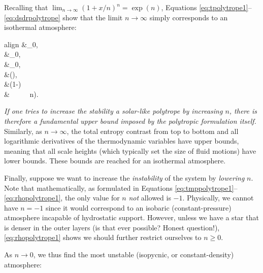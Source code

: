 \documentclass[12pt]{article} %
\begin{document}
Recalling that $\lim_{n\rightarrow\infty}(1+x/n)^n=\exp(n)$, Equations \eqref{eq:tpolytrope1}--\eqref{eq:dsdrpolytrope} show that the limit $n\rightarrow\infty$ simply corresponds to an isothermal atmosphere:
	\begin{empheq}[box=\fbox]{align}\label{eq:limitninfty}
\tmpref\ofr&\rightarrow \tmpref_0, \\
\prsref\ofr&\rightarrow \prsref_0,\\
\rhoref\ofr&\rightarrow \rhoref_0,\\
\dsdr &\rightarrow {}\left(\right),\\
 \andd \frac{\sref\ofr}{\cp} &\rightarrow {}\left(1-\right)\\ 
 &\ \ \ \ \  n\rightarrow\infty). \nonumber
\end{empheq}
\textit{If one tries to increase the stability a solar-like polytrope by increasing $n$, there is therefore a fundamental upper bound imposed by the polytropic formulation itself.}
Similarly, as $n\rightarrow\infty$, the total entropy contrast from top to bottom and all logarithmic derivatives of the thermodynamic variables have upper bounds, meaning that all scale heights (which typically set the size of fluid motions) have lower bounds. These bounds are reached for an isothermal atmosphere.

Finally, suppose we want to increase the \textit{instability} of the system by \textit{lowering} $n$. Note that mathematically, as formulated in Equations \eqref{eq:tmppolytrope1}--\eqref{eq:rhopolytrope1}, the only value for $n$ \textit{not} allowed is $-1$. Physically, we cannot have $n=-1$ since it would correspond to an isobaric (constant-pressure) atmosphere incapable of hydrostatic support. However, unless we have a star that is denser in the outer layers (is that ever possible? Honest question!), \eqref{eq:rhopolytrope1} shows we should further restrict ourselves to $n\geq0$. 

As $n\rightarrow0$, we thus find the most unstable (isopycnic, or constant-density) atmosphere: 
\end{document}
